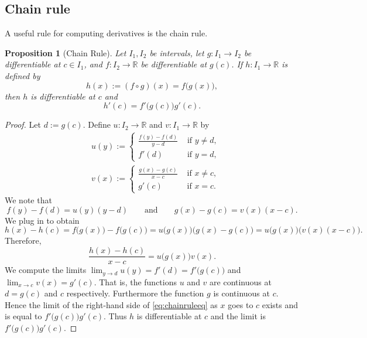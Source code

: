 \documentclass[12pt]{book}
\newcommand{\R}{{\mathbb{R}}}
\theoremstyle{plain}
\newtheorem{prop}[thm]{Proposition}
\theoremstyle{remark}
\theoremstyle{definition}
\theoremstyle{exercise}
\theoremstyle{example}
\begin{document}
\subsection{Chain rule}

A useful rule for computing derivatives 
is the chain rule.

\begin{prop}[Chain Rule]
Let $I_1, I_2$ be intervals, let
$g \colon I_1 \to I_2$ be differentiable at $c \in I_1$,
and
$f \colon I_2 \to \R$ be differentiable at $g(c)$.
If $h \colon I_1 \to \R$
is defined by
\begin{equation*}
h(x) := (f \circ g) (x) = f\bigl(g(x)\bigr) ,
\end{equation*}
then $h$ is differentiable at $c$ and
\begin{equation*}
h'(c) = f'\bigl(g(c)\bigr)g'(c) .
\end{equation*}
\end{prop}

\begin{proof}
Let $d := g(c)$.  Define
$u \colon I_2 \to \R$ and $v \colon I_1 \to \R$ by
\begin{align*}
& u(y) :=
\begin{cases}
 \frac{f(y) - f(d)}{y-d}  & \text{ if $y \not=d$,} \\
f'(d) & \text{ if $y = d$,}
\end{cases}
\\
& v(x) :=
\begin{cases}
\frac{g(x) - g(c)}{x-c} & \text{ if $x \not=c$,} \\
g'(c) & \text{ if $x = c$.}
\end{cases}
\end{align*}
We note that
\begin{equation*}
f(y)-f(d) = u(y) (y-d)
\qquad \text{and} \qquad
g(x)-g(c) = v(x) (x-c) .
\end{equation*}
We plug in to obtain
\begin{equation*}
h(x)-h(c)
=
f\bigl(g(x)\bigr)-f\bigl(g(c)\bigr)
=
u\bigl( g(x) \bigr) \bigl(g(x)-g(c)\bigr)
=
u\bigl( g(x) \bigr) \bigl(v(x) (x-c)\bigr) .
\end{equation*}
Therefore,
\begin{equation} \label{eq:chainruleeq}
\frac{h(x)-h(c)}{x-c}
=
u\bigl( g(x) \bigr) v(x) .
\end{equation}
We compute the limits $\lim_{y \to d} u(y)
= f'(d) = f'\bigl(g(c)\bigr)$ and
$\lim_{x \to c} v(x) = g'(c)$.
That is, the functions $u$ and $v$
are continuous at $d = g(c)$ and $c$ respectively.
Furthermore the function $g$ is continuous at $c$.
Hence the limit of
the right-hand side of \eqref{eq:chainruleeq}
as $x$ goes to $c$
exists and is equal to $f'\bigl(g(c)\bigr) g'(c)$.  Thus $h$
is differentiable at $c$ and the limit is $f'\bigl(g(c)\bigr)g'(c)$.
\end{proof}
\end{document}
